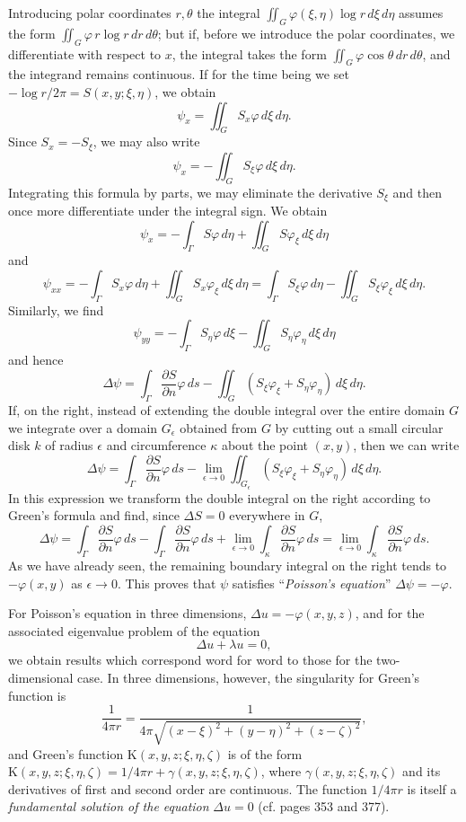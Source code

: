 Introducing polar coordinates $r,\theta$ the integral $\iint_G\varphi(\xi,\eta)\log r\,d\xi\,d\eta$ assumes the form $\iint_G\varphi\,r\log r\,dr\,d\theta$; but if, before we introduce the polar coordinates, we differentiate with respect to $x$, the integral takes the form $\iint_G\varphi\cos\theta\,dr\,d\theta$, and the integrand remains continuous. If for the time being we set $-\log r/2\pi=S(x,y;\xi,\eta)$, we obtain
\[
\psi_x=\iint_G S_x\varphi\,d\xi\,d\eta.
\]
Since $S_x=-S_\xi$, we may also write
\[
\psi_x=-\iint_G S_\xi\varphi\,d\xi\,d\eta.
\]
Integrating this formula by parts, we may eliminate the derivative $S_\xi$ and then once more differentiate under the integral sign. We obtain
\[
\psi_x=-\int_\Gamma S\varphi\,d\eta+\iint_G S\varphi_\xi\,d\xi\,d\eta
\]
and
\[
\psi_{xx}=-\int_\Gamma S_x\varphi\,d\eta+\iint_G S_x\varphi_\xi\,d\xi\,d\eta
=\int_\Gamma S_\xi\varphi\,d\eta-\iint_G S_\xi\varphi_\xi\,d\xi\,d\eta.
\]
Similarly, we find
\[
\psi_{yy}=-\int_\Gamma S_\eta\varphi\,d\xi-\iint_G S_\eta\varphi_\eta\,d\xi\,d\eta
\]
and hence
\[
\Delta\psi=\int_\Gamma\frac{\partial S}{\partial n}\varphi\,ds
-\iint_G(S_\xi\varphi_\xi+S_\eta\varphi_\eta)\,d\xi\,d\eta.
\]
If, on the right, instead of extending the double integral over the entire domain $G$ we integrate over a domain $G_\epsilon$ obtained from $G$ by cutting out a small circular disk $k$ of radius $\epsilon$ and circumference $\kappa$ about the point $(x,y)$, then we can write
\[
\Delta\psi=\int_\Gamma\frac{\partial S}{\partial n}\varphi\,ds
-\lim_{\epsilon\to0}\iint_{G_\epsilon}(S_\xi\varphi_\xi+S_\eta\varphi_\eta)\,d\xi\,d\eta.
\]
In this expression we transform the double integral on the right according to Green's formula and find, since $\Delta S=0$ everywhere in $G$,
\[
\Delta\psi=\int_\Gamma\frac{\partial S}{\partial n}\varphi\,ds
-\int_\Gamma\frac{\partial S}{\partial n}\varphi\,ds
+\lim_{\epsilon\to0}\int_\kappa\frac{\partial S}{\partial n}\varphi\,ds
=\lim_{\epsilon\to0}\int_\kappa\frac{\partial S}{\partial n}\varphi\,ds.
\]
As we have already seen, the remaining boundary integral on the right tends to $-\varphi(x,y)$ as $\epsilon\to0$. This proves that $\psi$ satisfies ``\emph{Poisson's equation}'' $\Delta\psi=-\varphi$.

For Poisson's equation in three dimensions, $\Delta u=-\varphi(x,y,z)$, and for the associated eigenvalue problem of the equation
\[
\Delta u+\lambda u=0,
\]
we obtain results which correspond word for word to those for the two-dimensional case. In three dimensions, however, the singularity for Green's function is
\[
\frac1{4\pi r}=\frac1{4\pi\sqrt{(x-\xi)^2+(y-\eta)^2+(z-\zeta)^2}},
\]
and Green's function $\mathrm K(x,y,z;\xi,\eta,\zeta)$ is of the form $\mathrm K(x,y,z;\xi,\eta,\zeta)=1/4\pi r+\gamma(x,y,z;\xi,\eta,\zeta)$, where $\gamma(x,y,z;\xi,\eta,\zeta)$ and its derivatives of first and second order are continuous. The function $1/4\pi r$ is itself a \emph{fundamental solution of the equation} $\Delta u=0$ (cf. pages 353 and 377).


